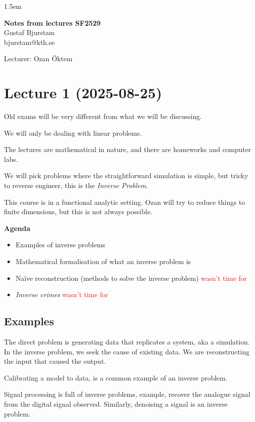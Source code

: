 \documentclass[12pt]{article}
\theoremstyle{definition}
\begin{document}
\baselineskip 1.5em

\begin{center}
\textbf{\large Notes from lectures SF2529} \\
Gustaf Bjurstam\\
bjurstam@kth.se\\
\end{center}
Lecturer: Ozan Öktem
\section{Lecture 1 (2025-08-25)}
Old exams will be very different from what we will be discussing.

We will only be dealing with linear problems.

The lectures are mathematical in nature, and there are homeworks and computer labs.

We will pick problems where the straightforward simulation is simple, but tricky to reverse engineer, this is the \textit{Inverse Problem}.

This course is in a functional analytic setting. Ozan will try to reduce things to finite dimensions, but this is not always possible.

\textbf{Agenda}
\begin{itemize}
    \item Examples of inverse problems
    \item Mathematical formalisation of what an inverse problem is
    \item Naïve reconstruction (methods to solve the inverse problem) \textcolor{red}{wasn't time for}
    \item \textit{Inverse crimes} \textcolor{red}{wasn't time for}
\end{itemize}

\subsection{Examples}
The direct problem is generating data that replicates a system, aka a simulation. In the inverse problem, we seek the cause of existing data. We are reconstructing the input that caused the output.

Calibrating a model to data, is a common example of an inverse problem.

Signal processing is full of inverse problems, example, recover the analogue signal from the digital signal observed. Similarly, denoising a signal is an inverse problem.
\end{document}

